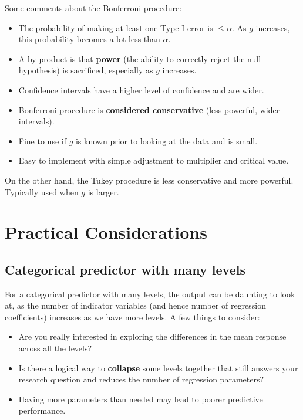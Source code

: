 \documentclass[
]{book}
\providecommand{\tightlist}{%
  \setlength{\itemsep}{0pt}\setlength{\parskip}{0pt}}
\begin{document}
Some comments about the Bonferroni procedure:

\begin{itemize}
\tightlist
\item
  The probability of making at least one Type I error is \(\leq \alpha\). As \(g\) increases, this probability becomes a lot less than \(\alpha\).
\item
  A by product is that \textbf{power} (the ability to correctly reject the null hypothesis) is sacrificed, especially as \(g\) increases.
\item
  Confidence intervals have a higher level of confidence and are wider.
\item
  Bonferroni procedure is \textbf{considered conservative} (less powerful, wider intervals).
\item
  Fine to use if \(g\) is known prior to looking at the data and is small.
\item
  Easy to implement with simple adjustment to multiplier and critical value.
\end{itemize}

On the other hand, the Tukey procedure is less conservative and more powerful. Typically used when \(g\) is larger.

\hypertarget{practical-considerations}{%
\section{Practical Considerations}\label{practical-considerations}}

\hypertarget{categorical-predictor-with-many-levels}{%
\subsection{Categorical predictor with many levels}\label{categorical-predictor-with-many-levels}}

For a categorical predictor with many levels, the output can be daunting to look at, as the number of indicator variables (and hence number of regression coefficients) increases as we have more levels. A few things to consider:

\begin{itemize}
\tightlist
\item
  Are you really interested in exploring the differences in the mean response across all the levels?
\item
  Is there a logical way to \textbf{collapse} some levels together that still answers your research question and reduces the number of regression parameters?
\item
  Having more parameters than needed may lead to poorer predictive performance.
\end{itemize}
\end{document}
